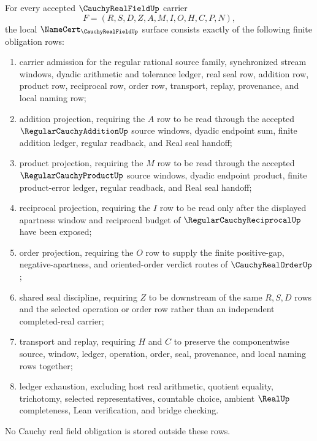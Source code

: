 \begin{theorem}
\label{thm:cauchy-real-field-namecert-obligations}
For every accepted $\CauchyRealFieldUp$ carrier
$$
F=(R,S,D,Z,A,M,I,O,H,C,P,N),
$$
the local $\NameCert_{\CauchyRealFieldUp}$ surface consists exactly of the following finite obligation rows:
\begin{enumerate}
\item carrier admission for the regular rational source family, synchronized stream windows, dyadic arithmetic and tolerance ledger, real seal row, addition row, product row, reciprocal row, order row, transport, replay, provenance, and local naming row;
\item addition projection, requiring the $A$ row to be read through the accepted $\RegularCauchyAdditionUp$ source windows, dyadic endpoint sum, finite addition ledger, regular readback, and Real seal handoff;
\item product projection, requiring the $M$ row to be read through the accepted $\RegularCauchyProductUp$ source windows, dyadic endpoint product, finite product-error ledger, regular readback, and Real seal handoff;
\item reciprocal projection, requiring the $I$ row to be read only after the displayed apartness window and reciprocal budget of $\RegularCauchyReciprocalUp$ have been exposed;
\item order projection, requiring the $O$ row to supply the finite positive-gap, negative-apartness, and oriented-order verdict routes of $\CauchyRealOrderUp$;
\item shared seal discipline, requiring $Z$ to be downstream of the same $R,S,D$ rows and the selected operation or order row rather than an independent completed-real carrier;
\item transport and replay, requiring $H$ and $C$ to preserve the componentwise source, window, ledger, operation, order, seal, provenance, and local naming rows together;
\item ledger exhaustion, excluding host real arithmetic, quotient equality, trichotomy, selected representatives, countable choice, ambient $\RealUp$ completeness, Lean verification, and bridge checking.
\end{enumerate}
No Cauchy real field obligation is stored outside these rows.
\end{theorem}
